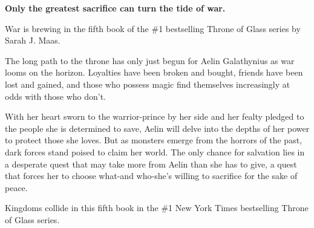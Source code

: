 
\newpage  %
\vspace*{\fill}
\begin{Center}
\textbf{Only the greatest sacrifice can turn the tide of war.}

\hfill \break War is brewing in the fifth book of the \#1 bestselling Throne of Glass series by Sarah J. Maas.

\hfill \break The long path to the throne has only just begun for Aelin Galathynius as war looms on the horizon. Loyalties have been broken and bought, friends have been lost and gained, and those who possess magic find themselves increasingly at odds with those who don't.

\hfill \break With her heart sworn to the warrior-prince by her side and her fealty pledged to the people she is determined to save, Aelin will delve into the depths of her power to protect those she loves. But as monsters emerge from the horrors of the past, dark forces stand poised to claim her world. The only chance for salvation lies in a desperate quest that may take more from Aelin than she has to give, a quest that forces her to choose what-and who-she's willing to sacrifice for the sake of peace.

\hfill \break Kingdoms collide in this fifth book in the \#1 New York Times bestselling Throne of Glass series. 
\end{Center}
\vspace*{\fill}
